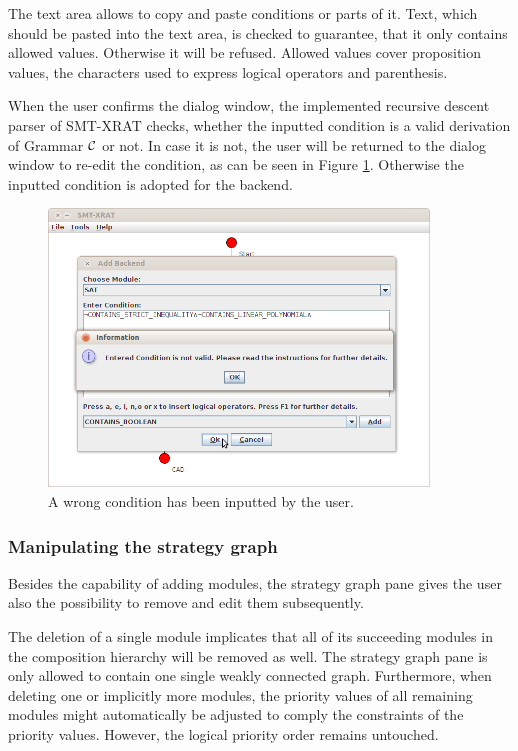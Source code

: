 The text area allows to copy and paste conditions or parts of it. Text, which should
be pasted into the text area, is checked to guarantee, that it only contains allowed
values. Otherwise it will be refused. Allowed values cover proposition values, the
characters used to express logical operators and parenthesis.

When the user confirms the dialog window, the implemented recursive descent parser of
SMT-XRAT checks, whether the inputted condition is a valid derivation of Grammar
$\cal C$ or not. In case it is not, the user will be returned to the dialog window
to re-edit the condition, as can be seen in Figure \ref{fig:smt-xrat_condition_wrong}.
Otherwise the inputted condition is adopted for the backend.

\begin{figure}
  \begin{center}
    \includegraphics[width=0.9\textwidth]{graphics/smt-xrat_condition_wrong.png}
  \end{center}
  \caption{A wrong condition has been inputted by the user.}
  \label{fig:smt-xrat_condition_wrong}
\end{figure}

\subsubsection{Manipulating the strategy graph}
\label{sec:manipulating_the_strategy_graph}
Besides the capability of adding modules, the strategy graph pane gives the user
also the possibility to remove and edit them subsequently.

The deletion of a single module implicates that all of its succeeding modules in
the composition hierarchy will be removed as well. The strategy graph pane is only
allowed to contain one single weakly connected graph. Furthermore, when deleting
one or implicitly more modules, the priority values of all remaining modules might
automatically be adjusted to comply the constraints of the priority values.
However, the logical priority order remains untouched.

